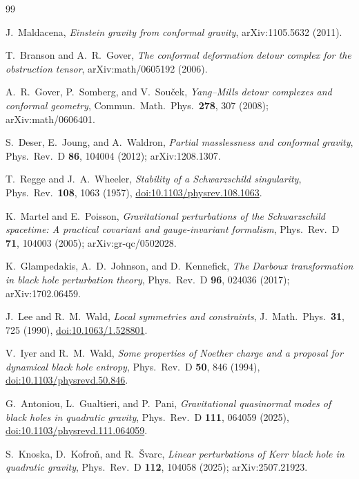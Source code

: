 \documentclass[11pt]{article}
\theoremstyle{definition}
\theoremstyle{remark}
\begin{document}
\begin{thebibliography}{99}

J.~Maldacena,
\emph{Einstein gravity from conformal gravity},
arXiv:1105.5632 (2011).

T.~Branson and A.~R.~Gover,
\emph{The conformal deformation detour complex for the obstruction tensor},
arXiv:math/0605192 (2006).

A.~R.~Gover, P.~Somberg, and V.~Sou\v cek,
\emph{Yang--Mills detour complexes and conformal geometry},
Commun.\ Math.\ Phys.\ \textbf{278}, 307 (2008);
arXiv:math/0606401.

S.~Deser, E.~Joung, and A.~Waldron,
\emph{Partial masslessness and conformal gravity},
Phys.\ Rev.\ D \textbf{86}, 104004 (2012);
arXiv:1208.1307.

T.~Regge and J.~A.~Wheeler,
\emph{Stability of a Schwarzschild singularity},
Phys.\ Rev.\ \textbf{108}, 1063 (1957),
\href{https://doi.org/10.1103/physrev.108.1063}{doi:10.1103/physrev.108.1063}.

K.~Martel and E.~Poisson,
\emph{Gravitational perturbations of the Schwarzschild spacetime: A
practical covariant and gauge-invariant formalism},
Phys.\ Rev.\ D \textbf{71}, 104003 (2005);
arXiv:gr-qc/0502028.

K.~Glampedakis, A.~D.~Johnson, and D.~Kennefick,
\emph{The Darboux transformation in black hole perturbation theory},
Phys.\ Rev.\ D \textbf{96}, 024036 (2017);
arXiv:1702.06459.

J.~Lee and R.~M.~Wald,
\emph{Local symmetries and constraints},
J.\ Math.\ Phys.\ \textbf{31}, 725 (1990),
\href{https://doi.org/10.1063/1.528801}{doi:10.1063/1.528801}.

V.~Iyer and R.~M.~Wald,
\emph{Some properties of Noether charge and a proposal for dynamical black
hole entropy},
Phys.\ Rev.\ D \textbf{50}, 846 (1994),
\href{https://doi.org/10.1103/physrevd.50.846}{doi:10.1103/physrevd.50.846}.

G.~Antoniou, L.~Gualtieri, and P.~Pani,
\emph{Gravitational quasinormal modes of black holes in quadratic gravity},
Phys.\ Rev.\ D \textbf{111}, 064059 (2025),
\href{https://doi.org/10.1103/physrevd.111.064059}{doi:10.1103/physrevd.111.064059}.

S.~Knoska, D.~Kofro\v n, and R.~\v Svarc,
\emph{Linear perturbations of Kerr black hole in quadratic gravity},
Phys.\ Rev.\ D \textbf{112}, 104058 (2025);
arXiv:2507.21923.


\end{thebibliography}
\end{document}
